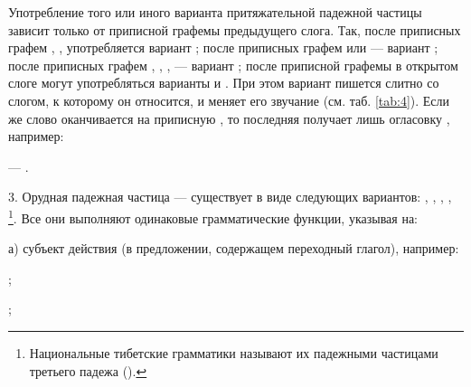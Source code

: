 Употребление того или иного варианта притяжательной падежной частицы зависит только от приписной графемы предыдущего слога. Так, после приписных графем , ,  употребляется вариант ; после приписных графем  или  --- вариант ; после приписных графем , , ,  --- вариант ; после приписной графемы  в открытом слоге могут употребляться варианты  и . При этом вариант  пишется слитно со слогом, к которому он относится, и меняет его звучание (см. таб. \ref{tab:4}). Если же слово оканчивается на приписную , то последняя получает лишь огласовку , например:
\begin{prfsample}
	\item {} --- .
\end{prfsample}

3. Орудная падежная частица --- существует в виде следующих вариантов:
, , , , \footnote[47]{Национальные тибетские грамматики называют их падежными частицами третьего падежа ().}.
Все они выполняют одинаковые грамматические функции, указывая на:

а) субъект действия (в предложении, содержащем переходный глагол), например:
\begin{prfsample}
	\item {};
	\item {};
\end{prfsample}


